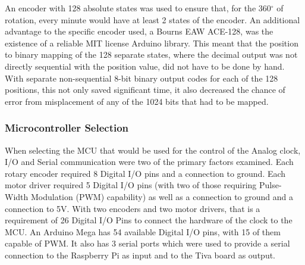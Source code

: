 \documentclass[11pt]{article}
\begin{document}
An encoder with 128 absolute states was used to ensure that, for the 360$^{\circ}$ of rotation, every minute would have at least 2 states of the encoder. 
An additional advantage to the specific encoder used, a Bourns EAW ACE-128, was the existence of a reliable MIT license Arduino library. 
This meant that the position to binary mapping of the 128 separate states, where the decimal output was not directly sequential with the position value, did not have to be done by hand. 
With separate non-sequential 8-bit binary output codes for each of the 128 positions, this not only saved significant time, it also decreased the chance of error from misplacement of any of the 1024 bits that had to be mapped. 


\subsubsection{Microcontroller Selection}
\label{MicrocontrollerDesign}

When selecting the MCU that would be used for the control of the Analog clock, I/O and Serial communication were two of the primary factors examined. 
Each rotary encoder required 8 Digital I/O pins and a connection to ground. 
Each motor driver required 5 Digital I/O pins (with two of those requiring Pulse-Width Modulation (PWM) capability) as well as a connection to ground and a connection to 5V. 
With two encoders and two motor drivers, that is a requirement of 26 Digital I/O Pins to connect the hardware of the clock to the MCU. 
An Arduino Mega has 54 available Digital I/O pins, with 15 of them capable of PWM. 
It also has 3 serial ports which were used to provide a serial connection to the Raspberry Pi as input and to the Tiva board as output. 
\end{document}
